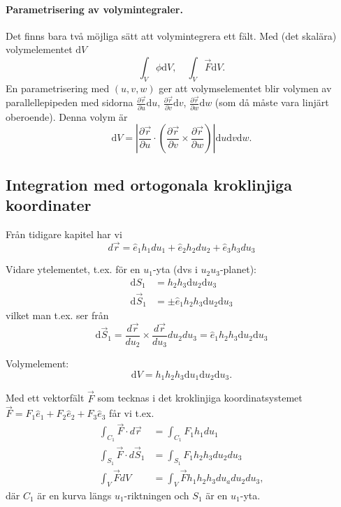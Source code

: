 \documentclass[%
oneside,                 %
final,                   %
10pt]{article}
\begin{document}
\paragraph{Parametrisering av volymintegraler.}
Det finns bara två möjliga sätt att volymintegrera ett fält. Med (det skalära) volymelementet $\mbox{d}V$
\begin{equation}
\int_V \phi \mbox{d}V,\quad \int_V \vec{F} \mbox{d}V.
\end{equation}
En parametrisering med $(u,v,w)$ ger att volymselementet blir volymen av parallellepipeden med sidorna $\frac{\partial \vec{r}}{\partial u} \mbox{d}u$, $\frac{\partial \vec{r}}{\partial v} \mbox{d}v$, $\frac{\partial \vec{r}}{\partial w} \mbox{d}w$ (som då måste vara linjärt oberoende). Denna volym är
\begin{equation}
\mbox{d}V = \left| \frac{\partial \vec{r}}{\partial u} \cdot \left( \frac{\partial \vec{r}}{\partial v} \times \frac{\partial \vec{r}}{\partial w} \right) \right| \mbox{d}u \mbox{d}v \mbox{d}w.
\end{equation}

\subsection*{Integration med ortogonala kroklinjiga koordinater}

Från tidigare kapitel har vi 
\begin{equation}
d\vec{r} = \hat{e}_1 h_1 du_1 + \hat{e}_2 h_2 du_2 + \hat{e}_3 h_3 du_3
\end{equation}

Vidare ytelementet, t.ex. för en $u_1$-yta (dvs i $u_2 u_3$-planet):
\begin{align}
\mbox{d} S_1 &= h_2 h_3 \mbox{d}u_2 \mbox{d}u_3 \\
\mbox{d} \vec{S}_1 &= \pm \hat{e}_1 h_2 h_3 \mbox{d}u_2 \mbox{d}u_3 
\end{align}
vilket man t.ex. ser från 
\begin{equation}
\mbox{d} \vec{S}_1 = \frac{d\vec{r}}{du_2} \times \frac{d\vec{r}}{du_3} du_2 du_3
= \hat{e}_1 h_2 h_3 \mbox{d}u_2 \mbox{d}u_3 
\end{equation}

Volymelement:
\begin{equation}
\mbox{d} V = h_1 h_2 h_3 \mbox{d}u_1 \mbox{d}u_2 \mbox{d}u_3.
\end{equation}

Med ett vektorfält $\vec{F}$ som tecknas i det kroklinjiga koordinatsystemet $\vec{F} = F_1 \hat{e}_1 + F_2 \hat{e}_2 + F_3 \hat{e}_3$ får vi t.ex.
\begin{align}
\int_{C_1} \vec{F} \cdot d\vec{r} &= \int_{C_1} F_1 h_1 du_1 \\
\int_{S_1} \vec{F} \cdot d\vec{S}_1 &= \int_{S_1} F_1 h_2 h_3 du_2 du_3 \\
\int_V \vec{F} dV &= \int_V \vec{F} h_1 h_2 h_3 du_a du_2 du_3,
\end{align}
där $C_1$ är en kurva längs $u_1$-riktningen och $S_1$ är en $u_1$-yta.
\end{document}
